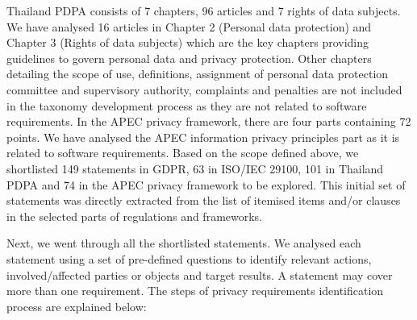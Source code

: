 Thailand PDPA consists of 7 chapters, 96 articles and 7 rights of data subjects. We have analysed 16 articles in Chapter 2 (Personal data protection) and Chapter 3 (Rights of data subjects) which are the key chapters providing guidelines to govern personal data and privacy protection. Other chapters detailing the scope of use, definitions, assignment of personal data protection committee and supervisory authority, complaints and penalties are not included in the taxonomy development process as they are not related to software requirements. In the APEC privacy framework, there are four parts containing 72 points. We have analysed the APEC information privacy principles part as it is related to software requirements. Based on the scope defined above, we shortlisted 149 statements in GDPR, 63 in ISO/IEC 29100, 101 in Thailand PDPA and 74 in the APEC privacy framework to be explored. This initial set of statements was directly extracted from the list of itemised items and/or clauses in the selected parts of regulations and frameworks.

Next, we went through all the shortlisted statements. We analysed each statement using a set of pre-defined questions to identify relevant actions, involved/affected parties or objects and target results. A statement may cover more than one requirement.  The steps of privacy requirements identification process are explained below:


